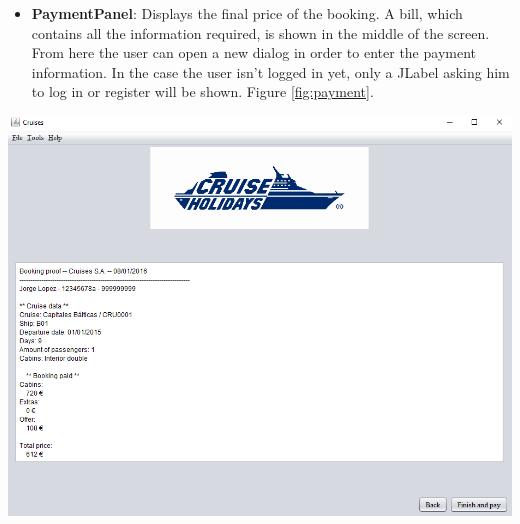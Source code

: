 \documentclass[11pt]{article}
\begin{document}
    \begin{qn}
    	\begin{itemize}
	   	    \item \textbf{PaymentPanel}: Displays the final price of the booking. A bill, which contains all the information required, is shown in the middle of the screen. From here the user can open a new dialog in order to enter the payment information. In the case the user isn't logged in yet, only a JLabel asking him to log in or register will be shown. Figure \ref{fig:payment}.
   	    \end{itemize}
   	    \begin{center}
	   	    \begin{minipage}{0.8\linewidth}
		   	   	\includegraphics[width=\linewidth]{images/payment.png}
		   	   	\label{fig:payment}
	   	    \end{minipage}
   	    \end{center}
   	\end{qn}
   	
\end{document}
